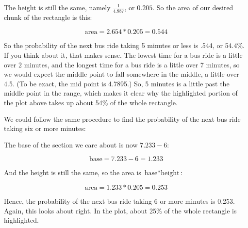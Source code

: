 \documentclass[../../../main.tex]{subfiles}
\begin{document}
The height is still the same, namely $\frac{1}{4.887}$, or $0.205$. So the area of our desired chunk of the rectangle is this:

\begin{equation*}
  \text{area} = 2.654 * 0.205 = 0.544
\end{equation*}

So the probability of the next bus ride taking 5 minutes or less is .544, or 54.4\%. If you think about it, that makes sense. The lowest time for a bus ride is a little over 2 minutes, and the longest time for a bus ride is a little over 7 minutes, so we would expect the middle point to fall somewhere in the middle, a little over 4.5. (To be exact, the mid point is 4.7895.) So, 5 minutes is a little past the middle point in the range, which makes it clear why the highlighted portion of the plot above takes up about 54\% of the whole rectangle. 

We could follow the same procedure to find the probability of the next bus ride taking six or more minutes:

\begin{center}
\end{center}

The base of the section we care about is now $7.233 - 6$:

\begin{equation*}
  \text{base} = 7.233 - 6 = 1.233
\end{equation*}

And the height is still the same, so the area is $\text{base} * \text{height}$:

\begin{equation*}
  \text{area} = 1.233 * 0.205 = 0.253
\end{equation*}

Hence, the probability of the next bus ride taking 6 or more minutes is 0.253. Again, this looks about right. In the plot, about 25\% of the whole rectangle is highlighted.
\end{document}
